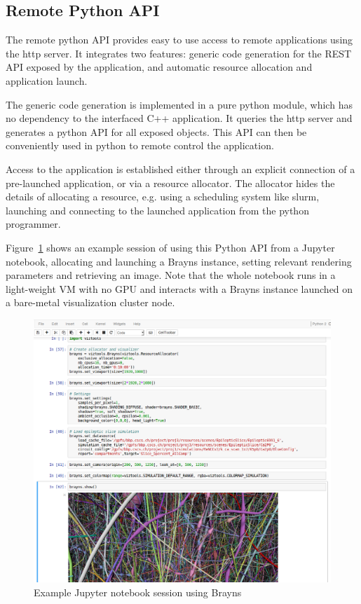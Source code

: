 \documentclass[10pt]{llncs}
\newcommand{\fig}[1]{Figure~\ref{#1}}
\begin{document}
\subsection{Remote Python API}

The remote python API provides easy to use access to remote applications using
the http server. It integrates two features: generic code generation for the
REST API exposed by the application, and automatic resource allocation and
application launch.

The generic code generation is implemented in a pure python module, which has
no dependency to the interfaced C++ application. It queries the http server and
generates a python API for all exposed objects. This API can then be
conveniently used in python to remote control the application.

Access to the application is established either through an explicit connection
of a pre-launched application, or via a resource allocator. The allocator hides
the details of allocating a resource, e.g. using a scheduling system like
slurm, launching and connecting to the launched application from the python
programmer.

\fig{fJupyter} shows an example session of using this Python API from a Jupyter
notebook, allocating and launching a Brayns instance, setting relevant rendering
parameters and retrieving an image. Note that the whole notebook runs in a
light-weight VM with no GPU and interacts with a Brayns instance launched on a
bare-metal visualization cluster node.

\begin{figure}[ht]\center
  \includegraphics[width=\columnwidth]{images/jupyter}
  \caption{\label{fJupyter}Example Jupyter notebook session using Brayns}
\end{figure}
\end{document}
